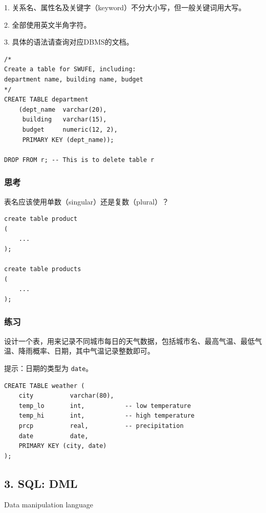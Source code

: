 \documentclass[aspectratio=169, 14pt]{beamer}
\begin{document}
{
\begin{frame}[standout]
	1. 关系名、属性名及关键字（keyword）不分大小写，但一般关键词用大写。

	2. 全部使用英文半角字符。

	3. 具体的语法请查询对应DBMS的文档。
\end{frame}
}

\begin{frame}[fragile]
	\begin{verbatim}
/*
Create a table for SWUFE, including:
department name, building name, budget
*/        
CREATE TABLE department
    (dept_name  varchar(20),
     building   varchar(15),
     budget     numeric(12, 2),
     PRIMARY KEY (dept_name)); 

DROP FROM r; -- This is to delete table r
    \end{verbatim}
\end{frame}
\begin{frame}[fragile]
	\frametitle{思考}
	{\large {}} 表名应该使用单数（singular）还是复数（plural）？

	\begin{verbatim}
create table product
(
    ...
);

create table products
(
    ...
);
\end{verbatim}
\end{frame}
\begin{frame}
	\frametitle{练习}

	{\large {}} 设计一个表，用来记录不同城市每日的天气数据，包括城市名、最高气温、最低气温、降雨概率、日期，其中气温记录整数即可。

	提示：日期的类型为 \texttt{date}。
\end{frame}

\begin{frame}[fragile]
	\begin{verbatim}
CREATE TABLE weather (
    city          varchar(80),
    temp_lo       int,           -- low temperature
    temp_hi       int,           -- high temperature
    prcp          real,          -- precipitation
    date          date,
    PRIMARY KEY (city, date)
);
    \end{verbatim}
\end{frame}

\begin{frame}
	\section{\textcolor{darkmidnightblue}{3. SQL: DML}}
	Data manipulation language

\end{frame}
\end{document}
